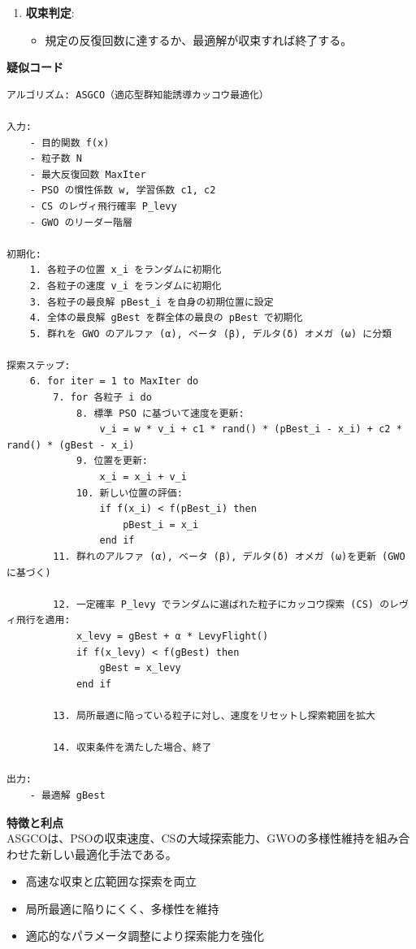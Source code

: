 \documentclass[a4paper]{ltjsarticle}
\begin{document}
\begin{tcolorbox}[arc=6mm, enhanced, borderline={0.5mm}{0mm}{black}, breakable, colback = white]
\begin{enumerate}
        \item \textbf{収束判定}:
        \begin{itemize}
            \item 規定の反復回数に達するか、最適解が収束すれば終了する。
        \end{itemize}
    \end{enumerate}
    \vspace{10pt}

    \noindent \textbf{疑似コード}\\
    \begin{lstlisting}[frame = tb]
アルゴリズム: ASGCO（適応型群知能誘導カッコウ最適化）

入力:
    - 目的関数 f(x)
    - 粒子数 N
    - 最大反復回数 MaxIter
    - PSO の慣性係数 w, 学習係数 c1, c2
    - CS のレヴィ飛行確率 P_levy
    - GWO のリーダー階層

初期化:
    1. 各粒子の位置 x_i をランダムに初期化
    2. 各粒子の速度 v_i をランダムに初期化
    3. 各粒子の最良解 pBest_i を自身の初期位置に設定
    4. 全体の最良解 gBest を群全体の最良の pBest で初期化
    5. 群れを GWO のアルファ (α), ベータ (β), デルタ(δ) オメガ (ω) に分類

探索ステップ:
    6. for iter = 1 to MaxIter do
        7. for 各粒子 i do
            8. 標準 PSO に基づいて速度を更新:
                v_i = w * v_i + c1 * rand() * (pBest_i - x_i) + c2 * rand() * (gBest - x_i)
            9. 位置を更新:
                x_i = x_i + v_i
            10. 新しい位置の評価:
                if f(x_i) < f(pBest_i) then
                    pBest_i = x_i
                end if
        11. 群れのアルファ (α), ベータ (β), デルタ(δ) オメガ (ω)を更新 (GWO に基づく)

        12. 一定確率 P_levy でランダムに選ばれた粒子にカッコウ探索 (CS) のレヴィ飛行を適用:
            x_levy = gBest + α * LevyFlight()
            if f(x_levy) < f(gBest) then
                gBest = x_levy
            end if

        13. 局所最適に陥っている粒子に対し、速度をリセットし探索範囲を拡大

        14. 収束条件を満たした場合、終了

出力:
    - 最適解 gBest

    \end{lstlisting}

    \vspace{10pt}
    

    \noindent \textbf{特徴と利点}\\
    ASGCOは、PSOの収束速度、CSの大域探索能力、GWOの多様性維持を組み合わせた新しい最適化手法である。
    \begin{itemize}
        \item 高速な収束と広範囲な探索を両立
        \item 局所最適に陥りにくく、多様性を維持
        \item 適応的なパラメータ調整により探索能力を強化
    \end{itemize}
    
\end{tcolorbox}
\end{document}
